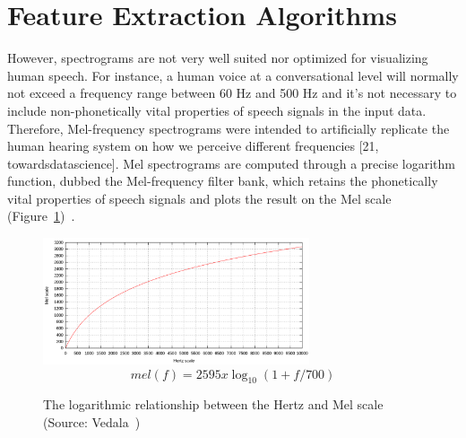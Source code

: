 \section{Feature Extraction Algorithms}

However, spectrograms are not very well suited nor optimized for visualizing human speech. For instance, a human voice at a conversational level will normally not exceed a frequency range between 60 Hz and 500 Hz and it’s not necessary to include non-phonetically vital properties of speech signals in the input data. Therefore, Mel-frequency spectrograms were intended to artificially replicate the human hearing system on how we perceive different frequencies [21, towardsdatascience]. Mel spectrograms are computed through a precise logarithm function, dubbed the Mel-frequency filter bank, which retains the phonetically vital properties of speech signals and plots the result on the Mel scale (Figure~\ref{fig:Melscale})~\cite{li_2015}.

\begin{figure}[th]
    \centering
    \includegraphics[width=0.7\textwidth]{Figures/melscale.png}
    \[mel(f) = 2595 x \log_10(1+ f/700)\]
    \decoRule
    \caption[Melscale]{The logarithmic relationship between the Hertz and Mel scale (Source: Vedala~\cite{vedala_2022})}
    \label{fig:Melscale}
\end{figure}

